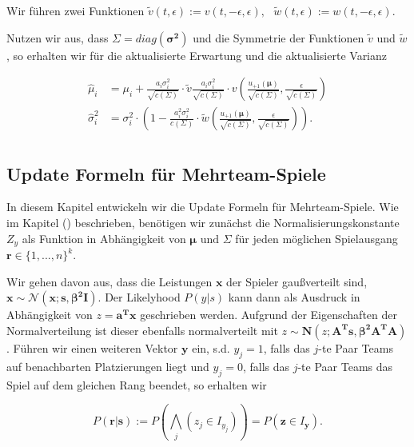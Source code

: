 \documentclass[12pt,a4paper]{scrartcl}
\numberwithin{equation}{section}
\begin{document}
Wir führen zwei Funktionen $\tilde v(t, \epsilon) := v(t, - \epsilon, \epsilon), \text{ 	} \tilde w(t, \epsilon) := w(t, - \epsilon, \epsilon) .$
 
Nutzen wir aus, dass $\mathbf{\varSigma} = diag(\mathbf{\sigma^2})$ und die Symmetrie der Funktionen $\tilde v$ und $\tilde w$, so erhalten wir für die aktualisierte Erwartung und die aktualisierte Varianz
 
\begin{equation}
\begin{split}
 \hat \mu_i &= \mu_i + \frac{a_i \sigma_i^2}{\sqrt{c(\mathbf{\varSigma})}} \cdot \tilde v \frac{a_i \sigma_i^2}{\sqrt{c(\mathbf{\varSigma})}} \cdot v \left ( \frac{u_{+1}(\mathbf{\mu})}{\sqrt{c(\mathbf{\varSigma})}}, \frac{\epsilon}{\sqrt{c(\mathbf{\varSigma})}}  \right ) \\
 \hat \sigma_i^2 &= \sigma_i^2 \cdot \left ( 1 - \frac{a_i^2 \sigma_i^2}{c(\mathbf{\varSigma})} \cdot \tilde w \left ( \frac{u_{+1}(\mathbf{\mu})}{\sqrt{c(\mathbf{\varSigma})}}, \frac{\epsilon}{\sqrt{c(\mathbf{\varSigma})}}  \right )  \right ). \\
 \end{split}
 \end{equation}
 
\subsection{Update Formeln für Mehrteam-Spiele	}
 
In diesem Kapitel entwickeln wir die Update Formeln für Mehrteam-Spiele. Wie im Kapitel () beschrieben, benötigen wir
zunächst die Normalisierungskonstante $Z_y$ als Funktion in Abhängigkeit von $\mathbf{\mu} \text{ und } \mathbf{\varSigma}$ für jeden möglichen Spielausgang
$\mathbf{r} \in \{ 1,...,n \}^k$. 

Wir gehen davon aus, dass die Leistungen $\mathbf{x}$ der Spieler gaußverteilt sind, $\mathbf{x} \sim \mathcal{N}(\mathbf{x;s, \beta^2 I})$.
Der Likelyhood $P(y|s)$ kann dann als Ausdruck in Abhängigkeit von $z = \mathbf{a^T x}$ geschrieben werden. Aufgrund der Eigenschaften 
der Normalverteilung ist dieser ebenfalls normalverteilt mit $z \sim \mathbf{N}(z;\mathbf{A^T s, \beta^2 A^T A})$. Führen wir einen weiteren Vektor $\mathbf{y}$ ein, s.d. 
$y_j = 1$, falls das $j$-te Paar Teams auf benachbarten Platzierungen liegt und $y_j = 0$, falls das $j$-te Paar Teams das Spiel auf dem gleichen Rang beendet, so erhalten wir

\begin{equation}
 P(\mathbf{r|s}) := P \left ( \bigwedge_j (z_j \in I_{y_j})  \right ) = P(\mathbf{z} \in I_{\mathbf{y}}).
\end{equation}
\end{document}

